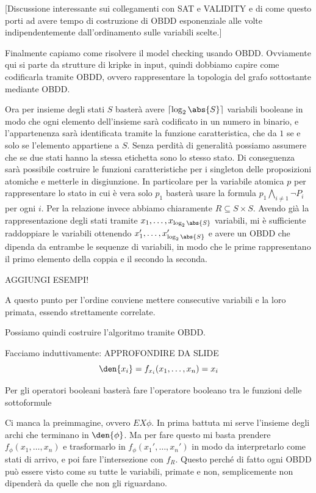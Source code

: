 [Discussione interessante sui collegamenti con SAT e VALIDITY e di come questo porti ad avere tempo di costruzione di OBDD esponenziale alle volte indipendentemente dall'ordinamento sulle variabili scelte.]

Finalmente capiamo come risolvere il model checking usando OBDD. Ovviamente qui si parte da strutture di kripke in input, quindi dobbiamo capire come codificarla tramite OBDD, ovvero rappresentare la topologia del grafo sottostante mediante OBDD.

Ora per insieme degli stati \(S\) basterà avere \(\lceil\log_2 \abs{S}\rceil\) variabili booleane in modo che ogni elemento dell'insieme sarà codificato in un numero in binario, e l'appartenenza sarà identificata tramite la funzione caratteristica, che da \(1\) se e solo se l'elemento appartiene a \(S\). Senza perdità di generalità possiamo assumere che se due stati hanno la stessa etichetta sono lo stesso stato. Di conseguenza sarà possibile costruire le funzioni caratteristiche per i singleton delle proposizioni atomiche e metterle in disgiunzione. In particolare per la variabile atomica \(p\) per rappresentare lo stato in cui è vera solo \(p_1\) basterà usare la formula \(p_1 \bigwedge_{i \neq 1} \neg P_i\) per ogni \(i\). Per la relazione invece abbiamo chiaramente \(R\subseteq S\times S\). Avendo già la rappresentazione degli stati tramite \(x_1, \ldots, x_{\log_2\abs{S}}\) variabili, mi è sufficiente raddoppiare le variabili ottenendo \(x_1', \ldots, x_{\log_2\abs{S}}'\) e avere un OBDD che dipenda da entrambe le sequenze di variabili, in modo che le prime rappresentano il primo elemento della coppia e il secondo la seconda.

AGGIUNGI ESEMPI!

A questo punto per l'ordine conviene mettere consecutive variabili e la loro primata, essendo strettamente correlate.

Possiamo quindi costruire l'algoritmo tramite OBDD\@.

Facciamo induttivamente:
APPROFONDIRE DA SLIDE
\[\den{x_i} = f_{x_i}(x_1, \ldots, x_{n}) = x_i\]

Per gli operatori booleani basterà fare l'operatore booleano tra le funzioni delle sottoformule

Ci manca la preimmagine, ovvero \(EX\phi\). In prima battuta mi serve l'insieme degli archi che terminano in \(\den{\phi}\). Ma per fare questo mi basta prendere \(f_{\phi}(x_1,\ldots,x_n)\) e trasformarlo in \(f_{\phi}(x_1', \ldots, x_n')\) in modo da interpretarlo come stati di arrivo, e poi fare l'intersezione con \(f_{R}\). Questo perché di fatto ogni OBDD può essere visto come su tutte le variabili, primate e non, semplicemente non dipenderà da quelle che non gli riguardano.

